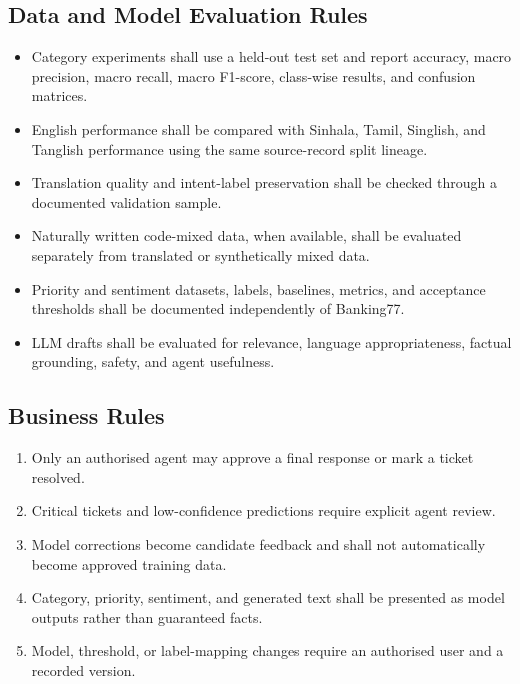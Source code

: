 \documentclass[10pt,letterpaper]{article}
\newenvironment{templatebody}{\par\justifying\setlength{\emergencystretch}{3em}}{\par}
\begin{document}
\begin{templatebody}
\subsection*{Data and Model Evaluation Rules}
\begin{itemize}
    \item Category experiments shall use a held-out test set and report accuracy, macro precision, macro recall, macro F1-score, class-wise results, and confusion matrices.
    \item English performance shall be compared with Sinhala, Tamil, Singlish, and Tanglish performance using the same source-record split lineage.
    \item Translation quality and intent-label preservation shall be checked through a documented validation sample.
    \item Naturally written code-mixed data, when available, shall be evaluated separately from translated or synthetically mixed data.
    \item Priority and sentiment datasets, labels, baselines, metrics, and acceptance thresholds shall be documented independently of Banking77.
    \item LLM drafts shall be evaluated for relevance, language appropriateness, factual grounding, safety, and agent usefulness.
\end{itemize}

\subsection*{Business Rules}
\begin{enumerate}
    \item Only an authorised agent may approve a final response or mark a ticket resolved.
    \item Critical tickets and low-confidence predictions require explicit agent review.
    \item Model corrections become candidate feedback and shall not automatically become approved training data.
    \item Category, priority, sentiment, and generated text shall be presented as model outputs rather than guaranteed facts.
    \item Model, threshold, or label-mapping changes require an authorised user and a recorded version.
\end{enumerate}


\end{templatebody}
\end{document}
